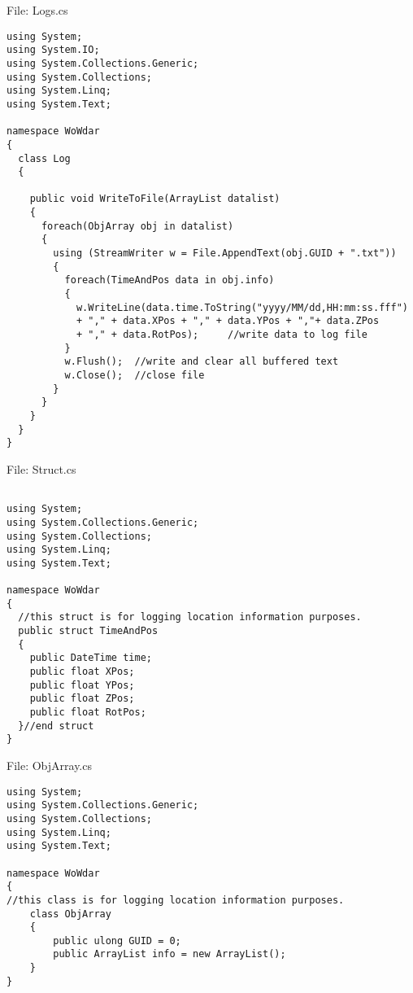 File: Logs.cs
\begin{lstlisting}
using System;
using System.IO;
using System.Collections.Generic;
using System.Collections;
using System.Linq;
using System.Text;

namespace WoWdar
{
  class Log
  {

    public void WriteToFile(ArrayList datalist)
    {
      foreach(ObjArray obj in datalist)
      {
        using (StreamWriter w = File.AppendText(obj.GUID + ".txt"))
        {
          foreach(TimeAndPos data in obj.info)
          {
            w.WriteLine(data.time.ToString("yyyy/MM/dd,HH:mm:ss.fff") 
            + "," + data.XPos + "," + data.YPos + ","+ data.ZPos 
            + "," + data.RotPos);     //write data to log file
          }
          w.Flush();  //write and clear all buffered text
          w.Close();  //close file
        }
      }
    }
  }
}

\end{lstlisting}

File: Struct.cs
\begin{lstlisting}

using System;
using System.Collections.Generic;
using System.Collections;
using System.Linq;
using System.Text;

namespace WoWdar
{
  //this struct is for logging location information purposes.
  public struct TimeAndPos
  {
    public DateTime time;
    public float XPos;
    public float YPos;
    public float ZPos;
    public float RotPos;
  }//end struct
}

\end{lstlisting}


File: ObjArray.cs
\begin{lstlisting}
using System;
using System.Collections.Generic;
using System.Collections;
using System.Linq;
using System.Text;

namespace WoWdar
{
//this class is for logging location information purposes.
    class ObjArray
    {
        public ulong GUID = 0;
        public ArrayList info = new ArrayList();
    }
}

\end{lstlisting}

